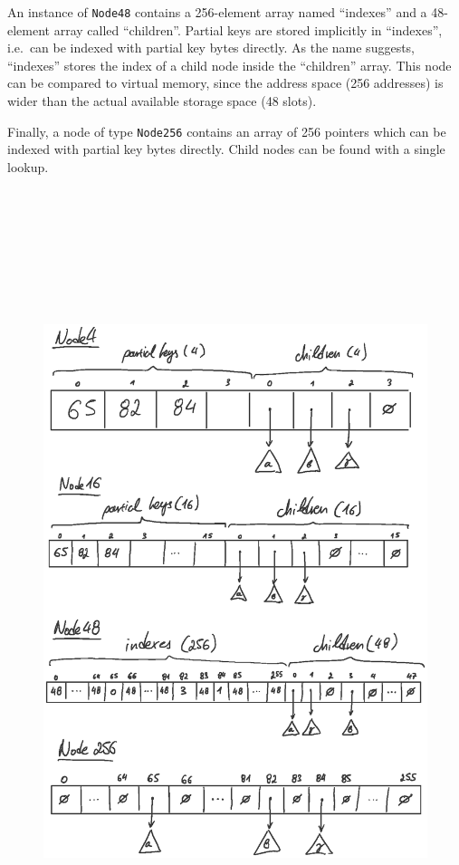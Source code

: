 \documentclass[abstracton,12pt]{scrartcl}
\theoremstyle{definition}
\begin{document}
An instance of \texttt{Node48} contains a 256-element array named 
``indexes'' and a 48-element array called ``children''.
Partial keys are stored implicitly in ``indexes'', i.e.\ 
can be indexed with partial key bytes directly.
As the name suggests, ``indexes'' stores the index of a child
node inside the ``children'' array. This node can be compared to
virtual memory, since the address space (256 addresses) is wider 
than the actual available storage space (48 slots).

Finally, a node of type \texttt{Node256} contains an array of
256 pointers which can be indexed with partial key bytes directly.
Child nodes can be found with a single lookup.

\begin{figure}[h!]
  \vspace{-4cm}
  \centering
  \includegraphics[height=23.5cm]{art_nodes_draw}

\end{figure}
\end{document}
